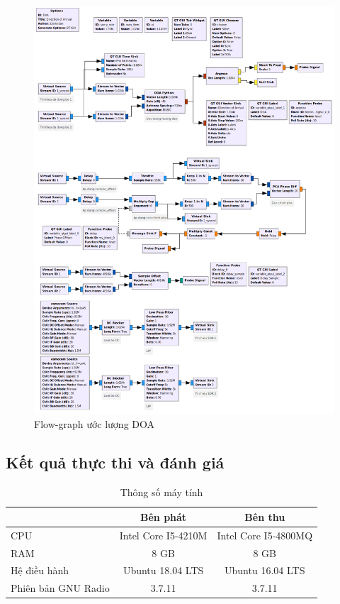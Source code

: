{{\begin{figure} [!ht]
	\includegraphics[width=\textwidth,height=\textheight,keepaspectratio]{figures/DoA_FM_grc.png}
	\caption{Flow-graph ước lượng DOA}
	\label{fig:DoA_FM}
\end{figure}

\subsection{Kết quả thực thi và đánh giá}

\begin{table}[!h]
\centering
\begin{tabular}{lcc}
\hline
\rowcolor[HTML]{FFE8E7} 
\multicolumn{1}{c}{\cellcolor[HTML]{FFE8E7}\textbf{Thông số}} & \textbf{Bên phát} & \textbf{Bên thu} \\ \hline
CPU & Intel Core I5-4210M & Intel Core I5-4800MQ \\
RAM & 8 GB & 8 GB \\
Hệ điều hành & Ubuntu 18.04 LTS & Ubuntu 16.04 LTS \\
Phiên bản GNU Radio & 3.7.11 & 3.7.11 \\ \hline
\end{tabular}
\caption{Thông số máy tính}
\label{table:hw}
\end{table}

}}
